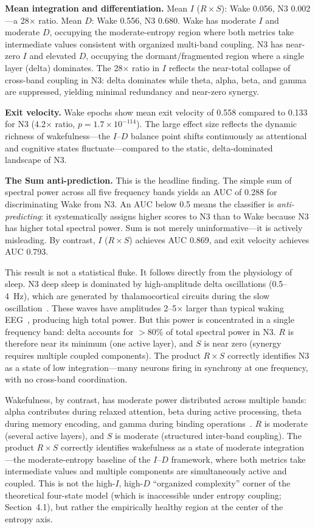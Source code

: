 \documentclass[aip,cha,reprint,amsmath,amssymb,final,floatfix]{revtex4-2}
\begin{document}
\textbf{Mean integration and differentiation.} Mean $I$ ($R \times S$): Wake 0.056, N3 0.002---a 28$\times$ ratio. Mean $D$: Wake 0.556, N3 0.680. Wake has moderate $I$ and moderate $D$, occupying the moderate-entropy region where both metrics take intermediate values consistent with organized multi-band coupling. N3 has near-zero $I$ and elevated $D$, occupying the dormant/fragmented region where a single layer (delta) dominates. The 28$\times$ ratio in $I$ reflects the near-total collapse of cross-band coupling in N3: delta dominates while theta, alpha, beta, and gamma are suppressed, yielding minimal redundancy and near-zero synergy.

\textbf{Exit velocity.} Wake epochs show mean exit velocity of 0.558 compared to 0.133 for N3 (4.2$\times$ ratio, $p = 1.7 \times 10^{-114}$). The large effect size reflects the dynamic richness of wakefulness---the $I$--$D$ balance point shifts continuously as attentional and cognitive states fluctuate---compared to the static, delta-dominated landscape of N3.

\textbf{The Sum anti-prediction.} This is the headline finding. The simple sum of spectral power across all five frequency bands yields an AUC of 0.288 for discriminating Wake from N3. An AUC below 0.5 means the classifier is \emph{anti-predicting}: it systematically assigns higher scores to N3 than to Wake because N3 has higher total spectral power. Sum is not merely uninformative---it is actively misleading. By contrast, $I$ ($R \times S$) achieves AUC 0.869, and exit velocity achieves AUC 0.793.

This result is not a statistical fluke. It follows directly from the physiology of sleep. N3 deep sleep is dominated by high-amplitude delta oscillations (0.5--4~Hz), which are generated by thalamocortical circuits during the slow oscillation~\cite{massimini2005}. These waves have amplitudes 2--5$\times$ larger than typical waking EEG~\cite{niedermeyer2005}, producing high total power. But this power is concentrated in a single frequency band: delta accounts for $>$80\% of total spectral power in N3. $R$ is therefore near its minimum (one active layer), and $S$ is near zero (synergy requires multiple coupled components). The product $R \times S$ correctly identifies N3 as a state of low integration---many neurons firing in synchrony at one frequency, with no cross-band coordination.

Wakefulness, by contrast, has moderate power distributed across multiple bands: alpha contributes during relaxed attention, beta during active processing, theta during memory encoding, and gamma during binding operations~\cite{buzsaki2006}. $R$ is moderate (several active layers), and $S$ is moderate (structured inter-band coupling). The product $R \times S$ correctly identifies wakefulness as a state of moderate integration---the moderate-entropy baseline of the $I$--$D$ framework, where both metrics take intermediate values and multiple components are simultaneously active and coupled. This is not the high-$I$, high-$D$ ``organized complexity'' corner of the theoretical four-state model (which is inaccessible under entropy coupling; Section~4.1), but rather the empirically healthy region at the center of the entropy axis.
\end{document}
